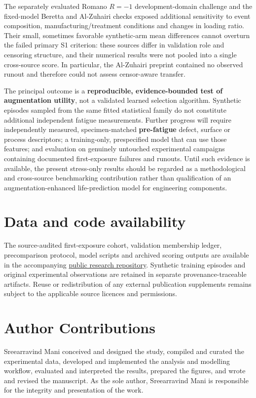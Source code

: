 \documentclass[12pt,a4paper]{article}
\begin{document}
The separately evaluated Romano \(R=-1\) development-domain challenge and the fixed-model Beretta and Al-Zuhairi checks exposed additional sensitivity to event composition, manufacturing/treatment conditions and changes in loading ratio. Their small, sometimes favorable synthetic-arm mean differences cannot overturn the failed primary S1 criterion: these sources differ in validation role and censoring structure, and their numerical results were not pooled into a single cross-source score. In particular, the Al-Zuhairi preprint contained no observed runout and therefore could not assess censor-aware transfer.

The principal outcome is a \textbf{reproducible, evidence-bounded test of augmentation utility}, not a validated learned selection algorithm. Synthetic episodes sampled from the same fitted statistical family do not constitute additional independent fatigue measurements. Further progress will require independently measured, specimen-matched \textbf{pre-fatigue} defect, surface or process descriptors; a training-only, prespecified model that can use those features; and evaluation on genuinely untouched experimental campaigns containing documented first-exposure failures and runouts. Until such evidence is available, the present stress-only results should be regarded as a methodological and cross-source benchmarking contribution rather than qualification of an augmentation-enhanced life-prediction model for engineering components.

\section*{Data and code availability}

The source-audited first-exposure cohort, validation membership ledger, precomparison protocol, model scripts and archived scoring outputs are available in the accompanying \href{https://github.com/sreearravind/Synthetic-Augmentation-for-Censor-Aware-Fatigue-Life-Prediction-of-LPBF-Al}{public research repository}. Synthetic training episodes and original experimental observations are retained in separate provenance-traceable artifacts. Reuse or redistribution of any external publication supplements remains subject to the applicable source licences and permissions.

\clearpage
\section*{Author Contributions}
Sreearravind Mani conceived and designed the study, compiled and curated the experimental data, developed and implemented the analysis and modelling workflow, evaluated and interpreted the results, prepared the figures, and wrote and revised the manuscript. As the sole author, Sreearravind Mani is responsible for the integrity and presentation of the work.
\end{document}
